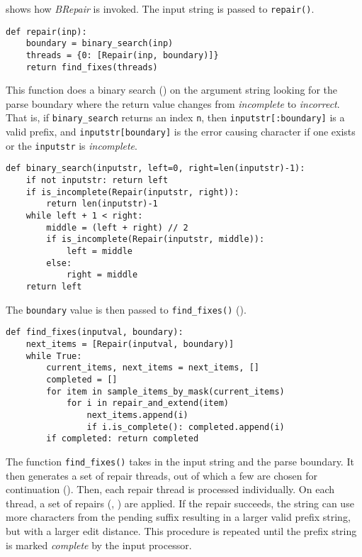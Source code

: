 \documentclass[sigconf,review,anonymous]{acmart}
\def\<#1>{\texttt{#1}}
\newcommand{\brepair}{\textit{BRepair}\xspace}
\begin{document}
 shows how \brepair is invoked. The input string is passed to
\<repair()>.
\begin{lstlisting}[caption=\brepair initial search,label={lst:brepair}]
def repair(inp):
    boundary = binary_search(inp)
    threads = {0: [Repair(inp, boundary)]}
    return find_fixes(threads)
\end{lstlisting}
This function does a binary search () on the
argument string looking for the parse boundary where the return value changes
from \emph{incomplete} to \emph{incorrect}. That is, if \<binary\_search>
returns an index \<n>, then \<inputstr[:boundary]> is a valid prefix, and
\<inputstr[boundary]> is the error causing character if one exists or the
\<inputstr> is \emph{incomplete}.
\begin{lstlisting}[caption=binary search,label={lst:bsearch}]
def binary_search(inputstr, left=0, right=len(inputstr)-1):
    if not inputstr: return left
    if is_incomplete(Repair(inputstr, right)):
        return len(inputstr)-1
    while left + 1 < right:
        middle = (left + right) // 2
        if is_incomplete(Repair(inputstr, middle)):
            left = middle
        else:
            right = middle
    return left
\end{lstlisting}
The \<boundary> value is then passed
to \<find\_fixes()> ().
\begin{lstlisting}[caption=find fixes,label={lst:findfixes}]
def find_fixes(inputval, boundary):
    next_items = [Repair(inputval, boundary)]
    while True:
        current_items, next_items = next_items, []
        completed = []
        for item in sample_items_by_mask(current_items)
            for i in repair_and_extend(item)
                next_items.append(i)
                if i.is_complete(): completed.append(i)
        if completed: return completed
\end{lstlisting}
The function \<find\_fixes()> takes in the input string and the parse boundary.
It then generates a set of repair threads, out of which a few are chosen for
continuation ().
Then, each repair thread is processed individually.
On each thread, a set of repairs (, )
are applied. If the repair succeeds,
the string can use more characters from the pending suffix resulting in a
larger valid prefix string, but with a larger edit distance. This procedure is
repeated until the prefix string is marked \emph{complete} by the input
processor.
\end{document}
